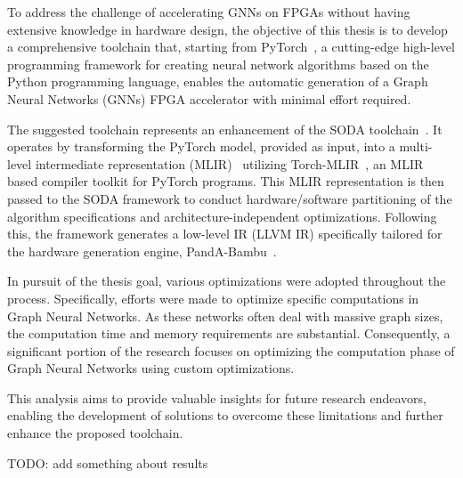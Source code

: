 To address the challenge of accelerating GNNs on FPGAs without having extensive knowledge in hardware design, the objective of this thesis is to develop a comprehensive toolchain that, starting from PyTorch~\cite{DBLP:journals/corr/abs-1912-01703},
a cutting-edge high-level programming framework for creating neural network algorithms based on the Python programming language, enables the
automatic generation of a Graph Neural Networks (GNNs) FPGA accelerator with minimal effort required.

The suggested toolchain represents an enhancement of the SODA toolchain~\cite{9786533}.
It operates by transforming the PyTorch model, provided as input, into a multi-level intermediate representation
(MLIR)~\cite{9370308} utilizing Torch-MLIR~\cite{torch_mlir}, an MLIR based compiler toolkit for PyTorch programs.
This MLIR representation is then passed to the SODA framework to conduct hardware/software partitioning of the algorithm
specifications and architecture-independent optimizations.
Following this, the framework generates a low-level IR (LLVM IR) specifically tailored for the hardware generation engine,
PandA-Bambu~\cite{9586110}.

In pursuit of the thesis goal, various optimizations were adopted throughout the process.
Specifically, efforts were made to optimize specific computations in Graph Neural Networks.
As these networks often deal with massive graph sizes, the computation time and memory requirements are substantial.
Consequently, a significant portion of the research focuses on optimizing the computation phase of Graph Neural Networks using
custom optimizations.

This analysis aims to provide valuable insights for future research endeavors, enabling the development of solutions
to overcome these limitations and further enhance the proposed toolchain.

TODO: add something about results

%

